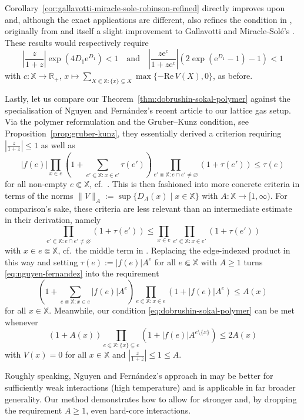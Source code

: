 \documentclass[reqno, 11pt]{amsart}
\theoremstyle{definition}
\newcommand{\e}{\mathrm{e}}
\newcommand{\R}{\mathbb{R}}
\newcommand{\X}{\mathbb X}
\newcommand{\be}{\begin{equation}}
\newcommand{\ee}{\end{equation}}
\renewcommand{\Re}{\mathrm{Re}\,}
\begin{document}
Corollary~\ref{cor:gallavotti-miracle-sole-robinson-refined} directly improves upon \cite[Theorem~5]{ref:procacci-scoppola} and, although the exact applications are different, also refines the condition in \cite[Theorem~4.2.7]{ref:ruelle}, originally from \cite{ref:gallavotti-miracle-sole-robinson} and itself a slight improvement to Gallavotti and Miracle-Sol{\'e}'s \cite{ref:gallavotti-miracle-sole}. 
These results would respectively require
\[
	|{\textstyle \frac{z}{1+z}}| \exp(4 {D_1} \e^{D_1}) < 1 \quad \text{and} \quad |{\textstyle \frac{z \e^c}{1+z\e^c}}| (2 \exp(\e^{D_1} - 1) - 1) < 1
\]
with $c : \X \to \overline{\R}_+$, $x \mapsto \sum_{X \Subset \X : \{x\} \subsetneq X} \max\{-\Re V(X), 0\}$, as before.

Lastly, let us compare our Theorem~\ref{thm:dobrushin-sokal-polymer} against the specialisation of Nguyen and Fern{\'a}ndez's recent article \cite{ref:nguyen-fernandez} to our lattice gas setup. 
Via the polymer reformulation and the Gruber--Kunz condition, see Proposition~\ref{prop:gruber-kunz}, they essentially derived a criterion requiring $|\frac{z}{1+z}| \leq 1$ as well as
\be \label{eq:nguyen-fernandez}
	|f(e)| \prod_{x \in e} \left( 1 + \sum_{e' \Subset \X : x \in e'} \tau(e') \right) \prod_{e' \Subset \X : e \cap e' \neq \varnothing} (1 + \tau(e')) \leq \tau(e)
\ee
for all non-empty $e \Subset \X$, cf.\ \cite[(107)]{ref:nguyen-fernandez}. 
This is then fashioned into more concrete criteria in terms of the norms $\|V\|_A := \sup \{D_A(x) \mid x\in\X\}$ with $A : \X \to [1,\infty)$. 
For comparison's sake, these criteria are less relevant than an intermediate estimate in their derivation, namely
\[
	\prod_{e' \Subset \X : e \cap e' \neq \varnothing} (1 + \tau(e')) \leq \prod_{x \in e} \prod_{e' \Subset \X : x \in e'} (1 + \tau(e'))
\]
with $x \in e \Subset \X$, cf.\ the middle term in \cite[(109)]{ref:nguyen-fernandez}. 
Replacing the edge-indexed product in this way and setting $\tau(e) := |f(e)| A^e$ for all $e \Subset \X$ with $A \geq 1$ turns \eqref{eq:nguyen-fernandez} into the requirement
\[
	\left( 1 + \sum_{e \Subset \X : x \in e} |f(e)| A^e \right) \prod_{e \Subset \X : x \in e} (1 + |f(e)| A^e) \leq A(x)
\]
for all $x \in \X$. 
Meanwhile, our condition \eqref{eq:dobrushin-sokal-polymer} can be met whenever
\[
	(1 + A(x)) \prod_{e \Subset \X : \{x\} \subsetneq e} (1 + |f(e)| A^{e \setminus \{x\}}) \leq 2 A(x)
\]
with $V(x) = 0$ for all $x \in \X$ and $|\frac{z}{1+z}| \leq 1 \leq A$. 

Roughly speaking, Nguyen and Fern{\'a}ndez's approach in \cite{ref:nguyen-fernandez} may be better for sufficiently weak interactions (high temperature) and is applicable in far broader generality. 
Our method demonstrates how to allow for stronger and, by dropping the requirement $A\geq 1$, even hard-core interactions.
\end{document}
